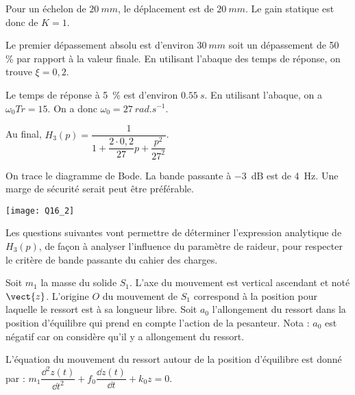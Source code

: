 \ifprof
\begin{corrige}
Pour un échelon de $\SI{20}{mm}$, le déplacement est de $\SI{20}{mm}$. Le gain statique est donc de $K=1$. 

Le premier dépassement absolu est d'environ $\SI{30}{mm}$ soit un dépassement de 50\, \% par rapport à la valeur finale. En utilisant l'abaque des temps de réponse, on trouve $\xi = 0,2$. 

Le temps de réponse à 5\, \% est d'environ $\SI{0,55}{s}$. En utilisant l'abaque, on a $\omega_0 Tr = 15$. On a donc $\omega_0=\SI{27}{rad.s^{-1}}$.

Au final, $H_3(p)=\dfrac{1}{1+\dfrac{2\cdot 0,2}{27}p+\dfrac{p^2}{27^2}}$.
\end{corrige}
\else
\fi


\ifprof
\begin{corrige}
On trace le diagramme de Bode. La bande passante à  \SI{-3}{dB} est de \SI{4}{Hz}. Une marge de sécurité serait peut être préférable.

\begin{center}
\texttt{[image: Q16\_2]}
\end{center}
\end{corrige}
\else
\fi

\ifprof
\else

Les questions suivantes vont permettre de déterminer l’expression analytique de $H_3(p)$, de façon à analyser l’influence du paramètre de raideur, pour respecter le critère de bande passante du cahier des charges.

Soit $m_1$ la masse du solide $S_1$. L’axe du mouvement est vertical ascendant et noté $\vect{z}$. L’origine $O$ du mouvement de $S_1$ correspond à la position pour laquelle le ressort est à sa longueur libre.
Soit $a_0$ l’allongement du ressort dans la position d’équilibre qui prend en compte l’action de la pesanteur. 
Nota : $a_0$ est négatif car on considère qu’il y a allongement du ressort.

L'équation du mouvement du ressort autour de la position d'équilibre est donné par : $m_1\dfrac{\dd^2 z(t)}{\dd t^2} + f_0 \dfrac{\dd z (t)}{\dd t}+k_0 z = 0$.
\fi

